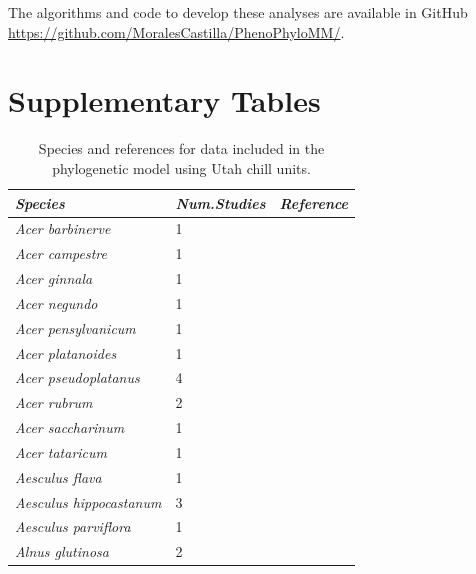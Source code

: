 \documentclass[11pt]{article}
\begin{document}
The algorithms and code to develop these analyses are available in GitHub \url{https://github.com/MoralesCastilla/PhenoPhyloMM/}.


\clearpage







\clearpage
\section{Supplementary Tables}



\begingroup\footnotesize
\begin{longtable}{p{}p{}p{}}
\caption{Species and references for data included in the phylogenetic model using Utah chill units.} \\ 
  \hline
\emph{Species} & \emph{Num.Studies} & \emph{Reference} \\ 
  \hline \endhead  \hline
\emph{Acer barbinerve} &   1 & \emph{\citep{zohner2016}} \\ 
  \emph{Acer campestre} &   1 & \emph{\citep{zohner2016}} \\ 
  \emph{Acer ginnala} &   1 & \emph{\citep{zohner2016}} \\ 
  \emph{Acer negundo} &   1 & \emph{\citep{Laube:2014a}} \\ 
  \emph{Acer pensylvanicum} &   1 & \emph{\citep{flynn2018}} \\ 
  \emph{Acer platanoides} &   1 & \emph{\citep{zohner2016}} \\ 
  \emph{Acer pseudoplatanus} &   4 & \emph{\citep{Basler:2012,Basler:2014aa,Laube:2014a,malyshev2018}} \\ 
  \emph{Acer rubrum} &   2 & \emph{\citep{flynn2018,nanninga17}} \\ 
  \emph{Acer saccharinum} &   1 & \emph{\citep{Webb:1977}} \\ 
  \emph{Acer tataricum} &   1 & \emph{\citep{Laube:2014a}} \\ 
  \emph{Aesculus flava} &   1 & \emph{\citep{zohner2016}} \\ 
  \emph{Aesculus hippocastanum} &   3 & \emph{\citep{Basler:2012,Laube:2014a,zohner2016}} \\ 
  \emph{Aesculus parviflora} &   1 & \emph{\citep{zohner2016}} \\ 
  \emph{Alnus glutinosa} &   2 & \emph{\citep{Heide:1993,Myking:1998aa}} \\ 

\end{longtable}
\end{document}
